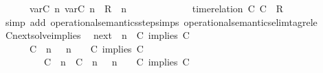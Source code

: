 \begin{isabellebody}
\ \ \ \ {\isasymsupseteq}\ {\isacharbraceleft}\ {\isacharparenleft}{\isacharparenleft}{\isasymlfloor}{\isasymtau}\isactrlsub v\isactrlsub a\isactrlsub r{\isacharparenleft}C\ n{\isacharparenright}{\isacharcomma}\ {\isasymtau}\isactrlsub v\isactrlsub a\isactrlsub r{\isacharparenleft}C\ n{\isacharparenright}{\isasymrfloor}\ {\isasymin}\ R{\isacharparenright}\ {\isacharhash}\ {\isasymGamma}{\isacharparenright}{\isacharcomma}n\isanewline
\ \ \ \ \ \ \ \ \ \ {\isasymturnstile}\ {\isasymPsi}\ {\isasymtriangleright}\ {\isacharparenleft}{\isacharparenleft}time{\isacharminus}relation\ {\isasymlfloor}C\ C\ {\isasymin}\ R{\isacharparenright}\ {\isacharhash}\ {\isasymPhi}{\isacharparenright}\ {\isacharbraceright}{\isacartoucheclose}\isanewline
%
\isadelimproof
%
\endisadelimproof
%
\isatagproof
{}\isamarkupfalse%
\ {\isacharparenleft}simp\ add{\isacharcolon}\ operational{\isacharunderscore}semantics{\isacharunderscore}step{\isachardot}simps\ operational{\isacharunderscore}semantics{\isacharunderscore}elim{\isachardot}tagrel{\isacharunderscore}e{\isacharparenright}%
\endisatagproof
{\isafoldproof}%
%
\isadelimproof
\isanewline
%
\endisadelimproof
\isanewline
{}\isamarkupfalse%
\ Cnext{\isacharunderscore}solve{\isacharunderscore}implies{\isacharcolon}\isanewline
\ \ {\isacartoucheopen}{\isacharparenleft}{\isasymC}\isactrlsub n\isactrlsub e\isactrlsub x\isactrlsub t\ {\isacharparenleft}{\isasymGamma}{\isacharcomma}\ n\ {\isasymturnstile}\ {\isacharparenleft}{\isacharparenleft}C\ implies\ C\ {\isacharhash}\ {\isasymPsi}{\isacharparenright}\ {\isasymtriangleright}\ {\isasymPhi}{\isacharparenright}{\isacharparenright}\isanewline
\ \ \ \ {\isasymsupseteq}\ {\isacharbraceleft}\ {\isacharparenleft}{\isacharparenleft}C\ {\isasymnot}{\isasymUp}\ n{\isacharparenright}\ {\isacharhash}\ {\isasymGamma}{\isacharparenright}{\isacharcomma}\ n\ {\isasymturnstile}\ {\isasymPsi}\ {\isasymtriangleright}\ {\isacharparenleft}{\isacharparenleft}C\ implies\ C\ {\isacharhash}\ {\isasymPhi}{\isacharparenright}{\isacharcomma}\isanewline
\ \ \ \ \ \ \ \ \ {\isacharparenleft}{\isacharparenleft}C\ {\isasymUp}\ n{\isacharparenright}\ {\isacharhash}\ {\isacharparenleft}C\ {\isasymUp}\ n{\isacharparenright}\ {\isacharhash}\ {\isasymGamma}{\isacharparenright}{\isacharcomma}\ n\ {\isasymturnstile}\ {\isasymPsi}\ {\isasymtriangleright}\ {\isacharparenleft}{\isacharparenleft}C\ implies\ C\ {\isacharhash}\ {\isasymPhi}{\isacharparenright}\ {\isacharbraceright}{\isacartoucheclose}\isanewline

\end{isabellebody}
